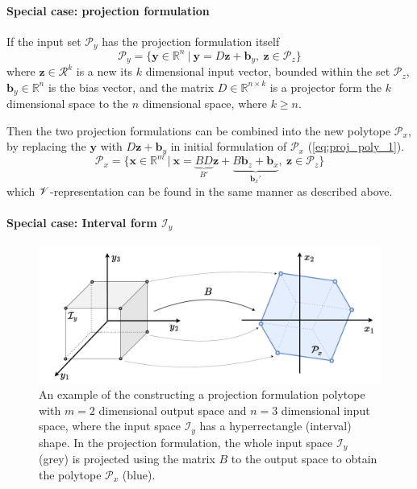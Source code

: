 \paragraph*{Special case: projection formulation} 
If the input set $\mathcal{P}_y$ has the projection formulation itself
\begin{equation}
    \mathcal{P}_y=\{\bm{y}\in  \mathbb{R}^n~|~ \bm{y}=D\bm{z} + \bm{b}_y, ~ \bm{z} \in \mathcal{P}_z \}
\end{equation}
where $\bm{z}\in\mathcal{R}^k$ is a new its $k$ dimensional input vector, bounded within the set $\mathcal{P}_z$, $\bm{b}_y\in\mathbb{R}^n$ is the bias vector, and the matrix $D\in \mathbb{R}^{n\times k}$ is a projector form the $k$ dimensional space to the $n$ dimensional space, where $k\geq n$.

Then the two projection formulations can be combined into the new polytope $\mathcal{P}_x$, by replacing the $\bm{y}$ with $D\bm{z} + \bm{b}_y$ in initial formulation of $\mathcal{P}_x$ (\ref{eq:proj_poly_1}).
\begin{equation}
    \mathcal{P}_x=\{\bm{x}\in  \mathbb{R}^m~|~ \bm{x}=\underbrace{BD}_{B'}\bm{z} + \underbrace{B\bm{b}_z + \bm{b}_x}_{\bm{b}_x'}, ~ \bm{z} \in \mathcal{P}_z \}
\end{equation}
which $\mathscr{V}$-representation can be found in the same manner as described above.

\paragraph*{Special case: Interval form $\mathcal{I}_y$} 


\begin{figure}
    \centering
    \includegraphics[width=0.8\linewidth]{Chapters/imgs/projection.pdf}
    \caption{An example of the constructing a projection formulation polytope with $m=2$ dimensional output space and $n=3$ dimensional input space, where the input space $\mathcal{I}_y$ has a hyperrectangle (interval) shape. In the projection formulation, the whole input space $\mathcal{I}_y$ (grey) is projected using the matrix $B$ to the output space to obtain the polytope $\mathcal{P}_x$ (blue). }
    \label{fig:proj}
\end{figure}

